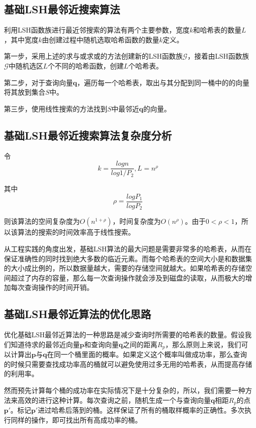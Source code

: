 \subsection{基础LSH最邻近搜索算法}

利用LSH函数族进行最近邻搜索的算法有两个主要参数，宽度$k$和哈希表的数量$L$，其中宽度$k$由创建过程中随机选取哈希函数的数量$k$定义。

第一步，采用上述的求与或求或的方法创建新的LSH函数族$\mathcal{G}$，接着由LSH函数族$\mathcal{G}$中随机选区$L$个不同的哈希函数，创建$L$个哈希表。

第二步，对于查询向量$\mathbf{q}$，遍历每一个哈希表，取出与其分配到同一桶中的的向量将其放到集合$S$中。

第三步，使用线性搜索的方法找到$S$中最邻近$\mathbf{q}$的向量。

\subsection{基础LSH最邻近搜索算法复杂度分析}
令
\[k=\frac{log n}{log 1/P_2},L=n^\rho\]

其中
\[\rho =\frac{log P_1}{log P_2}\]

则该算法的空间复杂度为$O(n^{1+\rho})$，时间复杂度为$O(n^\rho)$。由于$0<\rho <1$，所以该算法的搜索的时间效率高于线性搜索。

从工程实践的角度出发，基础LSH算法的最大问题是需要非常多的哈希表，从而在保证准确性的同时找到绝大多数的临近元素。而每个哈希表的空间大小是和数据集的大小成比例的，所以数据量越大，需要的存储空间就越大。如果哈希表的存储空间超过了内存的容量，那么每一次查询操作就会涉及到磁盘的读取，从而极大的增加每次查询操作的时间开销。

\subsection{基础LSH最邻近算法的优化思路}

优化基础LSH最邻近算法的一种思路是减少查询时所需要的哈希表的数量。假设我们知道待求的最邻近向量$\mathbf{p}$和查询向量$\mathbf{q}$之间的距离$R_p$，那么原则上来说，我们可以计算出$\mathbf{p}$与$\mathbf{q}$在同一个桶里面的概率。如果定义这个概率叫做成功率，那么查询的时候只需要查找成功率高的桶就可以避免使用过多无用的哈希表，从而提高存储的利用率。

然而预先计算每个桶的成功率在实际情况下是十分复杂的，所以，我们需要一种方法来高效的进行这种计算。每次查询之前，随机生成一个与查询向量$\mathbf{q}$相距$R_p$的点$\mathbf{p'}$。标记$\mathbf{p'}$进过哈希后落到的桶。这样保证了所有的桶取样概率的正确性。多次执行同样的操作，即可找出所有高成功率的桶。

